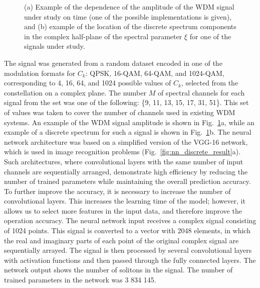 \begin{figure}[htpb]
\begin{minipage}[h]{0.5\linewidth}
{    }
    \end{minipage}
    \caption{(a) Example of the dependence of the amplitude of the WDM signal under study on time (one of the possible implementations is given), and (b) example of the location of the discrete spectrum components in the complex half-plane of the spectral parameter $\xi$ for one of the signals under study.}
    \label{fig:nn_discrete_example}
\end{figure}

The signal was generated from a random dataset encoded in one of the modulation formats for $C_k$: QPSK, 16-QAM, 64-QAM, and 1024-QAM, corresponding to 4, 16, 64, and 1024 possible values of $C_k$, selected from the constellation on a complex plane. The number $M$ of spectral channels for each signal from the set was one of the following: \{9, 11, 13, 15, 17, 31, 51\}. This set of values was taken to cover the number of channels used in existing WDM systems. An example of the WDM signal amplitude is shown in Fig.~\ref{fig:nn_discrete_example}a, while an example of a discrete spectrum for such a signal is shown in Fig.~\ref{fig:nn_discrete_example}b. The neural network architecture was based on a simplified version of the VGG-16 network, which is used in image recognition problems (Fig.~\ref{fig:nn_discrete_result}a). Such architectures, where convolutional layers with the same number of input channels are sequentially arranged, demonstrate high efficiency by reducing the number of trained parameters while maintaining the overall prediction accuracy. To further improve the accuracy, it is necessary to increase the number of convolutional layers. This increases the learning time of the model; however, it allows us to select more features in the input data, and therefore improve the operation accuracy. The neural network input receives a complex signal consisting of 1024 points. This signal is converted to a vector with 2048 elements, in which the real and imaginary parts of each point of the original complex signal are sequentially arrayed. The signal is then processed by several convolutional layers with activation functions and then passed
through the fully connected layers. The network output
shows the number of solitons in the signal. The number of
trained parameters in the network was 3 834 145.

